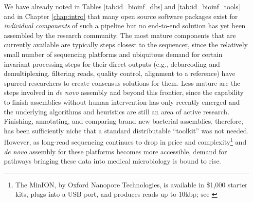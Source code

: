 We have already noted in Tables \ref{tab:id_bioinf_dbs} and \ref{tab:id_bioinf_tools} and in Chapter \ref{chap:intro} that many open source software packages exist for \emph{individual components} of such a pipeline but no end-to-end solution has yet been assembled by the research community. The most mature components that are currently available are typically steps closest to the sequencer, since the relatively small number of sequencing platforms and ubiquitous demand for certain invariant processing steps for their direct outputs (e.g., debarcoding and demultiplexing, filtering reads, quality control, alignment to a reference) have spurred researchers to create consensus solutions for them. Less mature are the steps involved in \emph{de novo} assembly and beyond this frontier, since the capability to finish assemblies without human intervention has only recently emerged\autocite{Bashir2012} and the underlying algorithms and heuristics are still an area of active research.\autocite{Sohn2016} Finishing, annotating, and comparing brand new bacterial assemblies, therefore, has been sufficiently niche that a standard distributable ``toolkit'' was not needed. However, as long-read sequencing continues to drop in price and complexity\footnote{The MinION, by Oxford Nanopore Technologies, is available in \$1,000 starter kits, plugs into a USB port, and produces reads up to 10kbp; see \textcite{Check2014}} and \emph{de novo} assembly for these platforms becomes more accessible, demand for pathways bringing these data into medical microbiology is bound to rise.\autocite{Judge2016}

